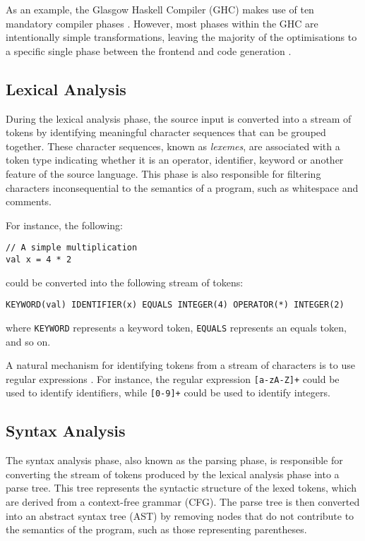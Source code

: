 As an example, the Glasgow Haskell Compiler (GHC) makes use of ten mandatory compiler phases
\autocite{ghccompiler}. However, most phases within the GHC are intentionally simple
transformations, leaving the majority of the optimisations to a specific single phase between the
frontend and code generation \autocite{jones1997transformation}.

\subsection{Lexical Analysis}

During the lexical analysis phase, the source input is converted into a stream of tokens by
identifying meaningful character sequences that can be grouped together. These character sequences,
known as \emph{lexemes}, are associated with a token type indicating whether it is an operator,
identifier, keyword or another feature of the source language. This phase is also responsible for
filtering characters inconsequential to the semantics of a program, such as whitespace and comments.

For instance, the following:

\begin{verbatim}
// A simple multiplication
val x = 4 * 2
\end{verbatim}

\noindent could be converted into the following stream of tokens:

\begin{verbatim}
KEYWORD(val) IDENTIFIER(x) EQUALS INTEGER(4) OPERATOR(*) INTEGER(2)
\end{verbatim}

\noindent where \texttt{KEYWORD} represents a keyword token,
\texttt{EQUALS} represents an equals token, and so on.

A natural mechanism for identifying tokens from a stream of characters is to use regular expressions
\autocite{aho2007compilers}. For instance, the regular expression \texttt{[a-zA-Z]+}
could be used to identify identifiers, while \texttt{[0-9]+} could be used to identify
integers.

\subsection{Syntax Analysis}

The syntax analysis phase, also known as the parsing phase, is responsible for converting the stream
of tokens produced by the lexical analysis phase into a parse tree. This tree represents the
syntactic structure of the lexed tokens, which are derived from a context-free grammar (CFG).
The parse tree is then converted into an abstract syntax tree (AST) by removing nodes that do not
contribute to the semantics of the program, such as those representing parentheses.

